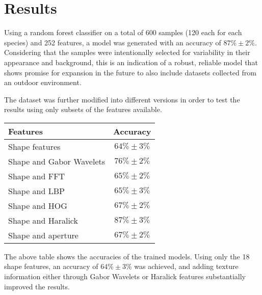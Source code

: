 \section{Results}

Using a random forest classifier on a total of 600 samples (120 each for each species) and 252 features, a model was generated with an accuracy of $87\% \pm 2\%$. Considering that the samples were intentionally selected for variability in their appearance and background, this is an indication of a robust, reliable model that shows promise for expansion in the future to also include datasets collected from an outdoor environment. 

The dataset was further modified into different versions in order to test the results using only subsets of the features available.

\begin{table} 
    \begin{tabular}{ l c }
        Features & Accuracy \\ \hline
        Shape features & $64\% \pm 3\%$ \\ 
        Shape and Gabor Wavelets & $76\% \pm 2\%$ \\ 
        Shape and FFT & $65\% \pm 2\%$ \\ 
        Shape and LBP & $65\% \pm 3\%$ \\ 
        Shape and HOG & $67\% \pm 2\%$ \\ 
        Shape and Haralick & $87\% \pm 3\%$ \\ 
        Shape and aperture & $67\% \pm 2\%$ \\ 
    \end{tabular} 
\end{table}

The above table shows the accuracies of the trained models. Using only the 18 shape features, an accuracy of $64\% \pm 3\%$ was achieved, and adding texture information either through Gabor Wavelets or Haralick features substantially improved the results.

  
  
  
  
  
  
  
  